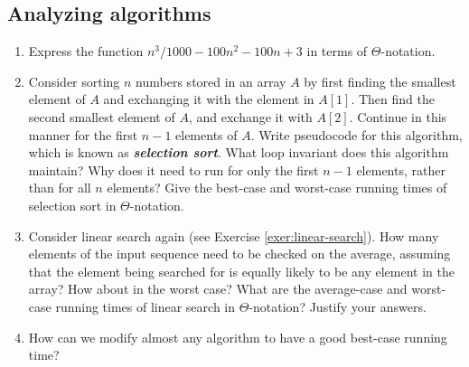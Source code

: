 \documentclass[Chapter02]{subfiles}
\begin{document}
	\subsection{Analyzing algorithms}

	\begin{enumerate}[leftmargin=\labelsep]
		\item Express the function $n^3/1000 - 100n^2 - 100n + 3$ in terms of $\Theta$-notation.
		\begin{answer}
			
		\end{answer}

		\item Consider sorting $n$ numbers stored in an array $A$ by first finding the smallest element of $A$ and exchanging it with the element in $A[1]$. Then find the second smallest element of $A$, and exchange it with $A[2]$. Continue in this manner for the first $n - 1$ elements of $A$. Write pseudocode for this algorithm, which is known as \textbf{\textit{selection sort}}. What loop invariant does this algorithm maintain? Why does it need to run for only the first $n - 1$ elements, rather than for all $n$ elements? Give the best-case and worst-case running times of selection sort in $\Theta$-notation.
		\begin{answer}
			
		\end{answer}

		\item Consider linear search again (see Exercise \ref{exer:linear-search}). How many elements of the input sequence need to be checked on the average, assuming that the element being searched for is equally likely to be any element in the array? How about in the worst case? What are the average-case and worst-case running times of linear search in $\Theta$-notation? Justify your answers.
		\begin{answer}
			
		\end{answer}

		\item How can we modify almost any algorithm to have a good best-case running time?
		\begin{answer}
			
		\end{answer}

	\end{enumerate}
\end{document}
